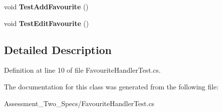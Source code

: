 \begin{DoxyCompactItemize}
\item 
\hypertarget{class_assessment___two___specs_1_1_favourite_handler_test_acabbf1e68422244d297e406d1e46855f}{
void {\bfseries TestAddFavourite} ()}
\label{class_assessment___two___specs_1_1_favourite_handler_test_acabbf1e68422244d297e406d1e46855f}

\item 
\hypertarget{class_assessment___two___specs_1_1_favourite_handler_test_a2ed8e8e1ab34b99e8384c4d5c8f0b0f0}{
void {\bfseries TestEditFavourite} ()}
\label{class_assessment___two___specs_1_1_favourite_handler_test_a2ed8e8e1ab34b99e8384c4d5c8f0b0f0}

\end{DoxyCompactItemize}


\subsection{Detailed Description}


Definition at line 10 of file FavouriteHandlerTest.cs.



The documentation for this class was generated from the following file:\begin{DoxyCompactItemize}
\item 
Assessment\_\-Two\_\-Specs/FavouriteHandlerTest.cs\end{DoxyCompactItemize}
